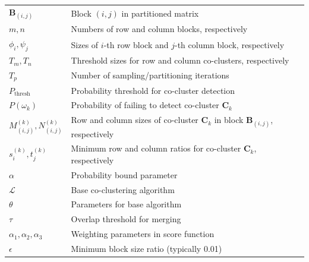 \documentclass[journal]{IEEEtran}
\theoremstyle{definition}
\theoremstyle{remark} %
\begin{document}
{\begin{table}[htbp]
\begin{tabular}{@{} p{} p{} @{}}
                $\mathbf{B}_{(i,j)}$               & Block $(i,j)$ in partitioned matrix                                             \\
                $m, n$                             & Numbers of row and column blocks, respectively                                                 \\
                $\phi_i, \psi_j$                   & Sizes of $i$-th row block and $j$-th column block, respectively                                \\
                $T_m, T_n$                         & Threshold sizes for row and column co-clusters, respectively                                  \\
                $T_p$                              & Number of sampling/partitioning iterations                                      \\
                $P_{\text{thresh}}$                & Probability threshold for co-cluster detection                                  \\
                $P(\omega_k)$                      & Probability of failing to detect co-cluster $\mathbf{C}_k$                      \\
                $M_{(i,j)}^{(k)}, N_{(i,j)}^{(k)}$ & Row and column sizes of co-cluster $\mathbf{C}_k$ in block $\mathbf{B}_{(i,j)}$, respectively \\
                $s_i^{(k)}, t_j^{(k)}$             & Minimum row and column ratios for co-cluster $\mathbf{C}_k$, respectively                     \\
                $\alpha$                           & Probability bound parameter                                                     \\
                $\mathcal{L}$                      & Base co-clustering algorithm                                                    \\
                $\theta$                           & Parameters for base algorithm                                                   \\
                $\tau$                             & Overlap threshold for merging                                                   \\
                $\alpha_1, \alpha_2, \alpha_3$     & Weighting parameters in score function                                          \\
                $\epsilon$                         & Minimum block size ratio (typically 0.01)                                       \\

\end{tabular}
\end{table}}
\end{document}
